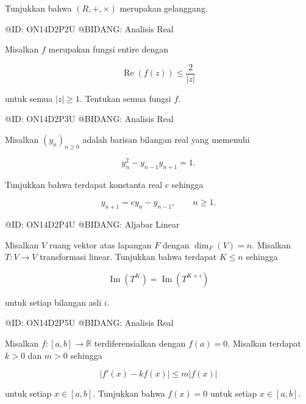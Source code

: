 Tunjukkan bahwa $(R,+,\times)$ merupakan gelanggang.

@ID: ON14D2P2U
@BIDANG: Analisis Real

Misalkan $f$ merupakan fungsi entire dengan

$$
\operatorname{Re}(f(z))
\le
\frac{2}{|z|}
$$

untuk semua $|z|\ge1$. Tentukan semua fungsi $f$.

@ID: ON14D2P3U
@BIDANG: Analisis Real

Misalkan $(y_n)_{n\ge0}$ adalah barisan bilangan real yang memenuhi

$$
y_n^2-y_{n-1}y_{n+1}=1.
$$

Tunjukkan bahwa terdapat konstanta real $c$ sehingga

$$
y_{n+1}=cy_n-y_{n-1},
\qquad n\ge1.
$$

@ID: ON14D2P4U
@BIDANG: Aljabar Linear

Misalkan $V$ ruang vektor atas lapangan $F$ dengan $\dim_F(V)=n$. Misalkan $T:V\to V$ transformasi linear. Tunjukkan bahwa terdapat $K\le n$ sehingga

$$
\operatorname{Im}(T^K)=\operatorname{Im}(T^{K+i})
$$

untuk setiap bilangan asli $i$.

@ID: ON14D2P5U
@BIDANG: Analisis Real

Misalkan $f:[a,b]\to\mathbb R$ terdiferensialkan dengan $f(a)=0$. Misalkan terdapat $k>0$ dan $m>0$ sehingga

$$
|f'(x)-kf(x)|
\le
m|f(x)|
$$

untuk setiap $x\in[a,b]$. Tunjukkan bahwa $f(x)=0$ untuk setiap $x\in[a,b]$.